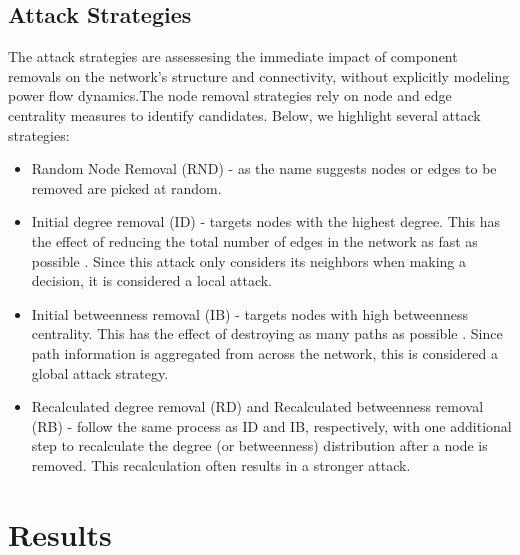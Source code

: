 \documentclass[10pt,twocolumn,letterpaper]{article}
\begin{document}
\subsection{Attack Strategies}

The attack strategies are assessesing the immediate impact of component removals on the network's structure and connectivity, without explicitly modeling power flow dynamics.The node removal strategies rely on node and edge centrality measures to identify candidates. Below, we highlight several attack strategies:

\begin{itemize}
    \item Random Node Removal (RND) - as the name suggests nodes or edges to be removed are picked at random.
    \item Initial degree removal (ID) - targets nodes with the highest degree. This has the effect of reducing the total number of edges in the network as fast as possible \cite{holme2002attack, beygelzimer2005improving}. Since this attack only considers its neighbors when making a decision, it is considered a local attack.
    \item Initial betweenness removal (IB) - targets nodes with high betweenness centrality. This has the effect of destroying as many paths as possible \cite{holme2002attack, beygelzimer2005improving}. Since path information is aggregated from across the network, this is considered a global attack strategy.
    \item Recalculated degree removal (RD) and Recalculated betweenness removal (RB) - follow the same process as ID and IB, respectively, with one additional step to recalculate the degree (or betweenness) distribution after a node is removed. This recalculation often results in a stronger attack.
\end{itemize}



\section{Results}
\label{sec:results}

\end{document}
